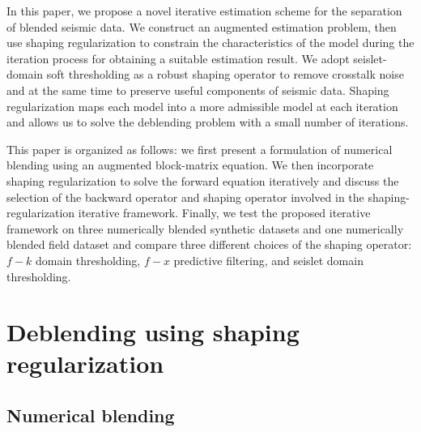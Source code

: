 In this paper, we propose a novel iterative estimation scheme for the separation of blended seismic data. We construct an augmented estimation problem, then use shaping regularization \cite[]{fomel2,fomel3} to constrain the characteristics of the model during the iteration process for obtaining a suitable estimation result.
We adopt seislet-domain \cite[]{seislet} soft thresholding as a robust shaping operator to remove crosstalk noise and at the same time to preserve useful components of seismic data. Shaping regularization maps each model into a more admissible model at each iteration and allows us to solve the deblending problem with a small number of iterations. 

This paper is organized as follows: we first present a formulation of numerical blending using an augmented block-matrix equation. We then incorporate shaping regularization to solve the forward equation iteratively and discuss the selection of the backward operator and shaping operator involved in the shaping-regularization iterative framework. Finally, we test the proposed iterative framework on three numerically blended synthetic datasets and one numerically blended field dataset and compare three different choices of the shaping operator: $f-k$ domain thresholding, $f-x$ predictive filtering, and seislet domain thresholding. 
 
\section{Deblending using shaping regularization}
\subsection{Numerical blending}

